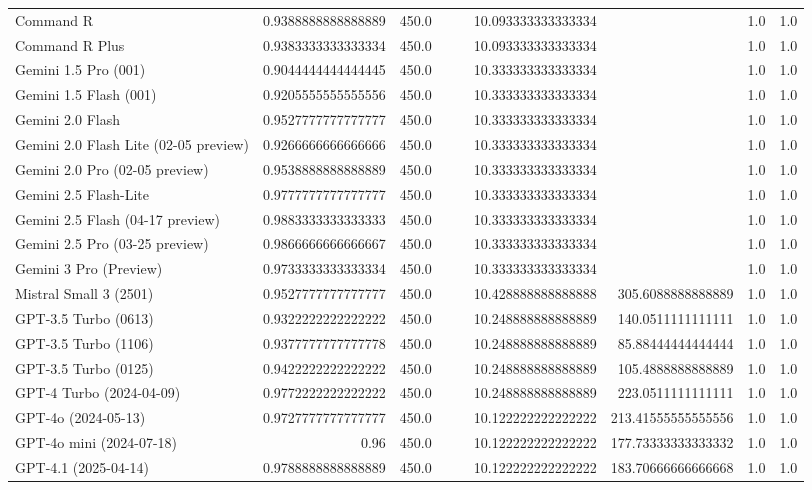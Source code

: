 \begin{table}[htp]
{\begin{tabular}{lrrrrrrrr}
Command R & 0.9388888888888889 & 450.0 &  &  & 10.093333333333334 &  & 1.0 & 1.0 \\
Command R Plus & 0.9383333333333334 & 450.0 &  &  & 10.093333333333334 &  & 1.0 & 1.0 \\
Gemini 1.5 Pro (001) & 0.9044444444444445 & 450.0 &  &  & 10.333333333333334 &  & 1.0 & 1.0 \\
Gemini 1.5 Flash (001) & 0.9205555555555556 & 450.0 &  &  & 10.333333333333334 &  & 1.0 & 1.0 \\
Gemini 2.0 Flash & 0.9527777777777777 & 450.0 &  &  & 10.333333333333334 &  & 1.0 & 1.0 \\
Gemini 2.0 Flash Lite (02-05 preview) & 0.9266666666666666 & 450.0 &  &  & 10.333333333333334 &  & 1.0 & 1.0 \\
Gemini 2.0 Pro (02-05 preview) & 0.9538888888888889 & 450.0 &  &  & 10.333333333333334 &  & 1.0 & 1.0 \\
Gemini 2.5 Flash-Lite & 0.9777777777777777 & 450.0 &  &  & 10.333333333333334 &  & 1.0 & 1.0 \\
Gemini 2.5 Flash (04-17 preview) & 0.9883333333333333 & 450.0 &  &  & 10.333333333333334 &  & 1.0 & 1.0 \\
Gemini 2.5 Pro (03-25 preview) & 0.9866666666666667 & 450.0 &  &  & 10.333333333333334 &  & 1.0 & 1.0 \\
Gemini 3 Pro (Preview) & 0.9733333333333334 & 450.0 &  &  & 10.333333333333334 &  & 1.0 & 1.0 \\
Mistral Small 3 (2501) & 0.9527777777777777 & 450.0 &  &  & 10.428888888888888 & 305.6088888888889 & 1.0 & 1.0 \\
GPT-3.5 Turbo (0613) & 0.9322222222222222 & 450.0 &  &  & 10.248888888888889 & 140.0511111111111 & 1.0 & 1.0 \\
GPT-3.5 Turbo (1106) & 0.9377777777777778 & 450.0 &  &  & 10.248888888888889 & 85.88444444444444 & 1.0 & 1.0 \\
GPT-3.5 Turbo (0125) & 0.9422222222222222 & 450.0 &  &  & 10.248888888888889 & 105.4888888888889 & 1.0 & 1.0 \\
GPT-4 Turbo (2024-04-09) & 0.9772222222222222 & 450.0 &  &  & 10.248888888888889 & 223.0511111111111 & 1.0 & 1.0 \\
GPT-4o (2024-05-13) & 0.9727777777777777 & 450.0 &  &  & 10.122222222222222 & 213.41555555555556 & 1.0 & 1.0 \\
GPT-4o mini (2024-07-18) & 0.96 & 450.0 &  &  & 10.122222222222222 & 177.73333333333332 & 1.0 & 1.0 \\
GPT-4.1 (2025-04-14) & 0.9788888888888889 & 450.0 &  &  & 10.122222222222222 & 183.70666666666668 & 1.0 & 1.0 \\

\end{tabular}}
\end{table}
